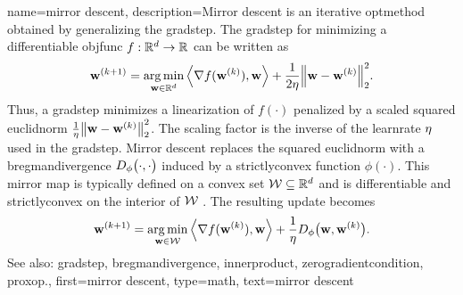 {name={mirror descent},
 	description={Mirror descent is an iterative \gls{optmethod}  
		obtained by generalizing the \gls{gradstep}. The 
 		\gls{gradstep} for minimizing a \gls{differentiable} \gls{objfunc} $f:\mathbb{R}^d \to \mathbb{R}$ 
 		can be written as
		\[
		\weights^{(\itercntr+1)} = \argmin_{\weights \in \mathbb{R}^\nrfeatures}
 		\left \langle \nabla f(\weights^{(\itercntr)}),\weights \right \rangle
 		+ \frac{1}{2\lrate}\normgeneric{\weights-\weights^{(\itercntr)}}{2}^{2}.
 		\]
 		Thus, a \gls{gradstep} minimizes a linearization of $f(\cdot)$ penalized 
 		by a scaled squared \gls{euclidnorm} $\frac{1}{\lrate}\normgeneric{\weights-\weights^{(\itercntr)}}{2}^{2}$. 
 	 	The scaling factor is the inverse of the \gls{learnrate} $\eta$ used in the \gls{gradstep}. 
		Mirror descent replaces the squared \gls{euclidnorm} with a 
 		\gls{bregmandivergence} $D_{\phi}\big( \cdot,\cdot \big)$ 
 		induced by a \gls{strictlyconvex} \gls{function} $\phi(\cdot)$. This 
 		mirror \gls{map} is typically defined on a \gls{convex} set 
 		$\mathcal{W} \subseteq \mathbb{R}^{d}$ and is \gls{differentiable} 
 		and \gls{strictlyconvex} on the interior of $\mathcal{W}$ \cite{CvxBubeck2015}. 
 		The resulting update becomes 
 		\[
 		{\bf w}^{(k+1)} 
 		= \operatorname*{arg\,min}_{{\bf w} \in \mathcal{W}}
 		\left \langle \nabla f({\bf w}^{(k)}),{\bf w} \right \rangle
 		+ \frac{1}{\eta} D_{\phi}\big( {\bf w},{\bf w}^{(k)} \big).
 		\]
 		See also: \gls{gradstep}, \gls{bregmandivergence}, \gls{innerproduct}, \gls{zerogradientcondition}, \gls{proxop}.},
 	first={mirror descent},
 	type=math,
 	text={mirror descent}
 }

